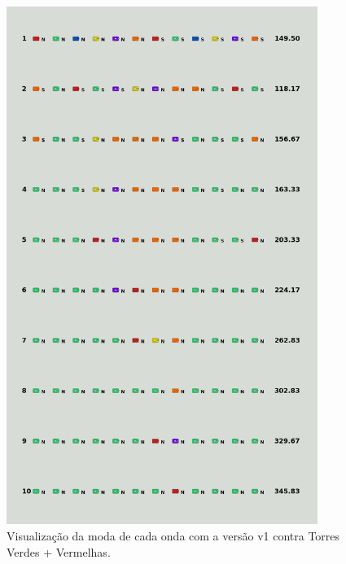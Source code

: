 \begin{figure}[H]
  \centering
  \includegraphics[width=0.9\textwidth]{figuras/td/td_greenred_ai_mode_1_1.png}
  \caption{Visualização da moda de cada onda com a versão v1 contra Torres Verdes + Vermelhas.}
  \label{fig:td-moda-greenred-1-1}
\end{figure}

